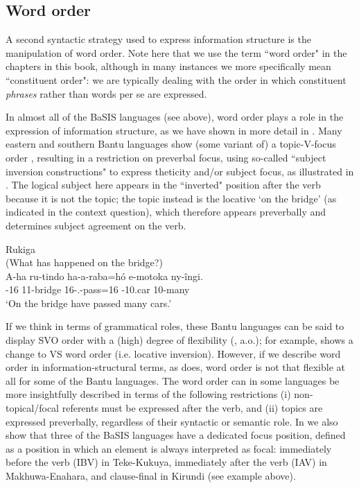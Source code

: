 \documentclass[output=paper]{langscibook}
\begin{document}
\subsection{Word order}

A second syntactic strategy used to express information structure is the manipulation of word order. Note here that we use the term ``word order" in the chapters in this book, although in many instances we more specifically mean ``constituent order": we are typically dealing with the order in which constituent \textit{phrases} rather than words per se are expressed.

In almost all of the BaSIS languages (see  above), word order plays a role in the expression of information structure, as we have shown in more detail in \citet{KerrEtAl2023}. Many eastern and southern Bantu languages show (some variant of) a topic-V-focus order \citep[see e.g.][]{vanderWal2009,Yoneda2011}, resulting in a restriction on preverbal focus, using so-called ``subject inversion constructions" to express theticity and/or subject focus, as illustrated in . The logical subject here appears in the ``inverted" position after the verb because it is not the topic; the topic instead is the locative ‘on the bridge’ (as indicated in the context question), which therefore appears preverbally and determines subject agreement on the verb.

\ea
\label{bkm:Ref131666802}
Rukiga \citep[2]{KerrEtAl2023}\\
(What has happened on the bridge?)\\
\gll
A-ha  ru-tindo        ha-a-raba=h\'{o}                e-motoka   ny-îngi.\\
\AUG{}-16  11-bridge     16\SM-\N.\PST-{}pass=16  \AUG{}-10.car   10-many\\
\glt
‘On the bridge have passed many cars.’\\
\z\pagebreak

If we think in terms of grammatical roles, these Bantu languages can be said to display SVO order with a (high) degree of flexibility (\citealp{Bearth2003,vanderWal2015,DowningMarten2019}, a.o.); for example,  shows a change to VS word order (i.e. locative inversion). However, if we describe word order in information-structural terms, as \citet{Good2010} does, word order is not that flexible at all for some of the Bantu languages. The word order can in some languages be more insightfully described in terms of the following restrictions (i) non-topical/focal referents must be expressed after the verb, and (ii) topics are expressed preverbally, regardless of their syntactic or semantic role. In \citet{KerrEtAl2023} we also show that three of the BaSIS languages have a dedicated focus position, defined as a position in which an element is always interpreted as focal: immediately before the verb (IBV) in Teke-Kukuya, immediately after the verb (IAV) in Makhuwa-Enahara, and clause-final in Kirundi (see example  above).
\end{document}
